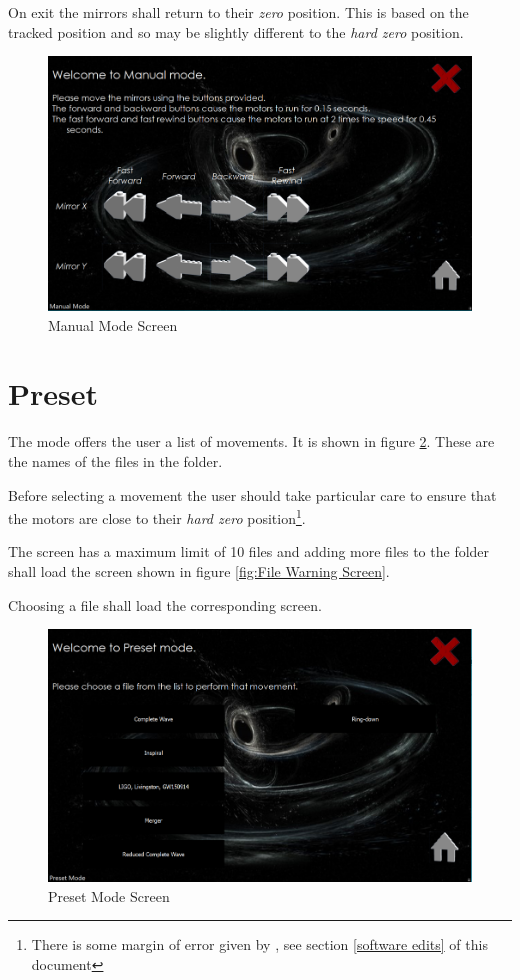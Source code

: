 \documentclass[a4paper, 12pt]{book}
\begin{document}
On exit the mirrors shall return to their \textit{zero} position. This is based on the tracked position and so may be slightly different to the \textit{hard zero} position.
\begin{figure}[ht]
\centering
\includegraphics[width=120mm]{Manual_Screen.png}
\caption{Manual Mode Screen}
\label{fig:Manual Mode Screen}
\end{figure}

\section{Preset}
The  mode offers the user a list of movements. It is shown in figure \ref{fig:Preset Mode Screen}. These are the names of the  files in the  folder.

Before selecting a movement the user should take particular care to ensure that the motors are close to their \textit{hard zero} position\footnote{\label{zero discrepency}There is some margin of error given by , see section \ref{software edits} of this document}.

The screen has a maximum limit of 10 files and adding more  files to the  folder shall load the  screen shown in figure \ref{fig:File Warning Screen}.

Choosing a file shall load the corresponding  screen.
\begin{figure}[ht]
\centering
\includegraphics[width=120mm]{Preset_Screen.png}
\caption{Preset Mode Screen}
\label{fig:Preset Mode Screen}
\end{figure}
\end{document}
